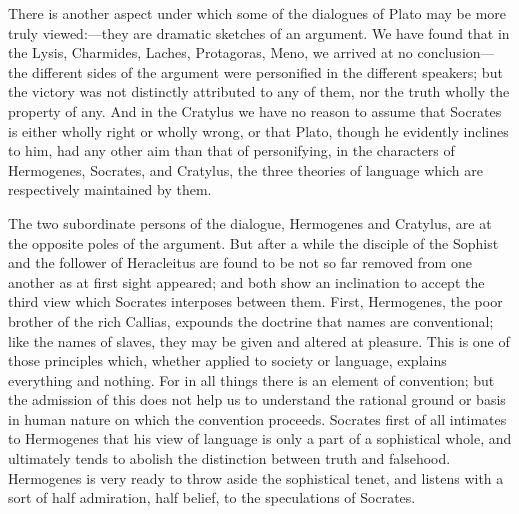 \documentclass[11pt,letter]{article}
\begin{document}
\par  There is another aspect under which some of the dialogues of Plato may be more truly viewed:—they are dramatic sketches of an argument. We have found that in the Lysis, Charmides, Laches, Protagoras, Meno, we arrived at no conclusion—the different sides of the argument were personified in the different speakers; but the victory was not distinctly attributed to any of them, nor the truth wholly the property of any. And in the Cratylus we have no reason to assume that Socrates is either wholly right or wholly wrong, or that Plato, though he evidently inclines to him, had any other aim than that of personifying, in the characters of Hermogenes, Socrates, and Cratylus, the three theories of language which are respectively maintained by them.

\par  The two subordinate persons of the dialogue, Hermogenes and Cratylus, are at the opposite poles of the argument. But after a while the disciple of the Sophist and the follower of Heracleitus are found to be not so far removed from one another as at first sight appeared; and both show an inclination to accept the third view which Socrates interposes between them. First, Hermogenes, the poor brother of the rich Callias, expounds the doctrine that names are conventional; like the names of slaves, they may be given and altered at pleasure. This is one of those principles which, whether applied to society or language, explains everything and nothing. For in all things there is an element of convention; but the admission of this does not help us to understand the rational ground or basis in human nature on which the convention proceeds. Socrates first of all intimates to Hermogenes that his view of language is only a part of a sophistical whole, and ultimately tends to abolish the distinction between truth and falsehood. Hermogenes is very ready to throw aside the sophistical tenet, and listens with a sort of half admiration, half belief, to the speculations of Socrates.
\end{document}
